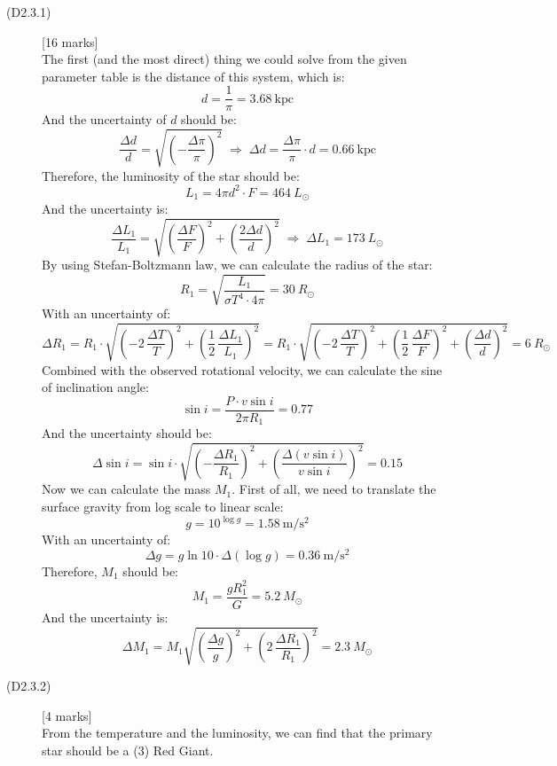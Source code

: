 \begin{description}
\item[(D2.3.1)] \hfill[16 marks]\\
  The first (and the most direct) thing we could solve from the given
  parameter table is the distance of this system, which is:
  \[ d = \frac{1}{\pi} = 3.68\ \mathrm{kpc} \tag*{(24)} \]
  And the uncertainty of $d$ should be:
  \[ \frac{\Delta d}{d}
     = \sqrt{ \left( -\frac{\Delta\pi}{\pi} \right)^2 }
     \;\Rightarrow\;
     \Delta d = \frac{\Delta\pi}{\pi} \cdot d
     = 0.66\ \mathrm{kpc} \tag*{(25)} \]
  Therefore, the luminosity of the star should be:
  \[ L_1 = 4\pi d^2 \cdot F = 464\ L_\odot \tag*{(26)} \]
  And the uncertainty is:
  \[ \frac{\Delta L_1}{L_1}
     = \sqrt{ \left( \frac{\Delta F}{F} \right)^2
       + \left( \frac{2\Delta d}{d} \right)^2 }
     \;\Rightarrow\; \Delta L_1 = 173\ L_\odot \tag*{(27)} \]
  By using Stefan-Boltzmann law, we can calculate the radius of the star:
  \[ R_1 = \sqrt{ \frac{L_1}{\sigma T^4 \cdot 4\pi} }
     = 30\ R_\odot \tag*{(28)} \]
  With an uncertainty of:
  \[ \Delta R_1 = R_1 \cdot \sqrt{
       \left( -2\,\frac{\Delta T}{T} \right)^2
       + \left( \frac{1}{2}\,\frac{\Delta L_1}{L_1} \right)^2 }
     = R_1 \cdot \sqrt{
       \left( -2\,\frac{\Delta T}{T} \right)^2
       + \left( \frac{1}{2}\,\frac{\Delta F}{F} \right)^2
       + \left( \frac{\Delta d}{d} \right)^2 }
     = 6\ R_\odot \tag*{(29)} \]
  Combined with the observed rotational velocity, we can calculate the sine
  of inclination angle:
  \[ \sin i = \frac{P \cdot v\sin i}{2\pi R_1} = 0.77 \tag*{(30)} \]
  And the uncertainty should be:
  \[ \Delta \sin i = \sin i \cdot \sqrt{
       \left( -\frac{\Delta R_1}{R_1} \right)^2
       + \left( \frac{\Delta (v\sin i)}{v\sin i} \right)^2 }
     = 0.15 \tag*{(31)} \]
  Now we can calculate the mass $M_1$. First of all, we need to translate the
  surface gravity from log scale to linear scale:
  \[ g = 10^{\log g} = 1.58\ \mathrm{m/s^2} \tag*{(32)} \]
  With an uncertainty of:
  \[ \Delta g = g \ln 10 \cdot \Delta(\log g)
     = 0.36\ \mathrm{m/s^2} \tag*{(33)} \]
  Therefore, $M_1$ should be:
  \[ M_1 = \frac{g R_1^2}{G} = 5.2\ M_\odot \tag*{(34)} \]
  And the uncertainty is:
  \[ \Delta M_1 = M_1 \sqrt{
       \left( \frac{\Delta g}{g} \right)^2
       + \left( 2\,\frac{\Delta R_1}{R_1} \right)^2 }
     = 2.3\ M_\odot \tag*{(35)} \]

\item[(D2.3.2)] \hfill[4 marks]\\
  From the temperature and the luminosity, we can find that the primary star
  should be a (3) Red Giant.


\end{description}
